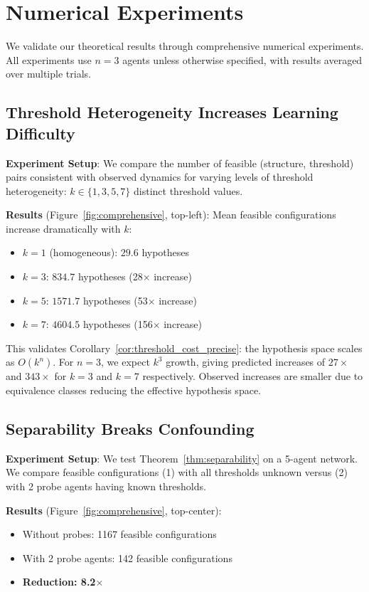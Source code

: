 \documentclass[11pt]{article}
\begin{document}
\section{Numerical Experiments}
\label{sec:experiments}

We validate our theoretical results through comprehensive numerical experiments. All experiments use $n=3$ agents unless otherwise specified, with results averaged over multiple trials.

\subsection{Threshold Heterogeneity Increases Learning Difficulty}

\textbf{Experiment Setup}: We compare the number of feasible (structure, threshold) pairs consistent with observed dynamics for varying levels of threshold heterogeneity: $k \in \{1, 3, 5, 7\}$ distinct threshold values.

\textbf{Results} (Figure~\ref{fig:comprehensive}, top-left): Mean feasible configurations increase dramatically with $k$:
\begin{itemize}
\item $k=1$ (homogeneous): $29.6$ hypotheses
\item $k=3$: $834.7$ hypotheses (28$\times$ increase)
\item $k=5$: $1571.7$ hypotheses (53$\times$ increase)  
\item $k=7$: $4604.5$ hypotheses (156$\times$ increase)
\end{itemize}

This validates Corollary~\ref{cor:threshold_cost_precise}: the hypothesis space scales as $O(k^n)$. For $n=3$, we expect $k^3$ growth, giving predicted increases of $27\times$ and $343\times$ for $k=3$ and $k=7$ respectively. Observed increases are smaller due to equivalence classes reducing the effective hypothesis space.

\subsection{Separability Breaks Confounding}

\textbf{Experiment Setup}: We test Theorem~\ref{thm:separability} on a 5-agent network. We compare feasible configurations (1) with all thresholds unknown versus (2) with 2 probe agents having known thresholds.

\textbf{Results} (Figure~\ref{fig:comprehensive}, top-center): 
\begin{itemize}
\item Without probes: 1167 feasible configurations
\item With 2 probe agents: 142 feasible configurations
\item \textbf{Reduction: 8.2$\times$}
\end{itemize}
\end{document}
